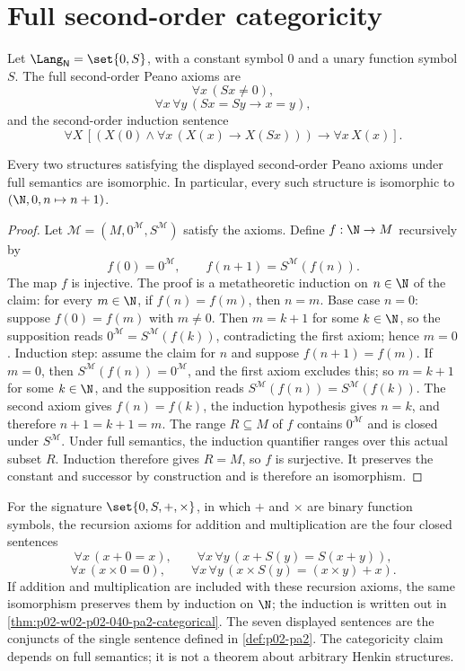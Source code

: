 \section{Full second-order categoricity}
\label{sec:second-order-logic-03}

Let \(\Lang_{\mathsf N}=\set{0,S}\), with a constant symbol \(0\) and a unary
function symbol \(S\).  The full second-order Peano axioms are
\[
  \forall x\,(Sx\ne0),
\]
\[
  \forall x\,\forall y\,(Sx=Sy\to x=y),
\]
and the second-order induction sentence
\[
  \forall X\,
  \left[
    \left(X(0)\land
      \forall x\,(X(x)\to X(Sx))\right)
    \to
    \forall x\,X(x)
  \right].
\]

\begin{theorem}
Every two structures satisfying the displayed second-order Peano axioms under
full semantics are isomorphic.  In particular, every such structure is
isomorphic to \((\N,0,n\mapsto n+1)\).
\end{theorem}

\begin{proof}
Let \(\mathcal M=(M,0^{\mathcal M},S^{\mathcal M})\) satisfy the axioms.  Define
\(f:\N\to M\) recursively by
\[
  f(0)=0^{\mathcal M},
  \qquad
  f(n+1)=S^{\mathcal M}(f(n)).
\]
The map \(f\) is injective.  The proof is a metatheoretic induction on
\(n\in\N\) of the claim: for every \(m\in\N\), if \(f(n)=f(m)\), then
\(n=m\).  Base case \(n=0\): suppose \(f(0)=f(m)\) with \(m\ne0\).  Then
\(m=k+1\) for some \(k\in\N\), so the supposition reads
\(0^{\mathcal M}=S^{\mathcal M}(f(k))\), contradicting the first axiom;
hence \(m=0\).  Induction step: assume the claim for \(n\) and suppose
\(f(n+1)=f(m)\).  If \(m=0\), then
\(S^{\mathcal M}(f(n))=0^{\mathcal M}\), and the first axiom excludes this;
so \(m=k+1\) for some \(k\in\N\), and the supposition reads
\(S^{\mathcal M}(f(n))=S^{\mathcal M}(f(k))\).  The second axiom gives
\(f(n)=f(k)\), the induction hypothesis gives \(n=k\), and therefore
\(n+1=k+1=m\).  The range \(R\subseteq M\) of \(f\) contains
\(0^{\mathcal M}\) and is closed under \(S^{\mathcal M}\).  Under full
semantics, the induction quantifier ranges over this actual subset \(R\).
Induction therefore gives \(R=M\), so \(f\) is surjective.  It preserves the
constant and successor by construction and is therefore an isomorphism.
\end{proof}

For the signature \(\set{0,S,+,\times}\), in which \(+\) and \(\times\) are
binary function symbols, the recursion axioms for addition and multiplication
are the four closed sentences
\[
  \forall x\,(x+0=x),
  \qquad
  \forall x\,\forall y\,(x+S(y)=S(x+y)),
\]
\[
  \forall x\,(x\times0=0),
  \qquad
  \forall x\,\forall y\,(x\times S(y)=(x\times y)+x).
\]
If addition and multiplication are included with these recursion axioms, the
same isomorphism preserves them by induction on \(\N\); the induction is
written out in \cref{thm:p02-w02-p02-040-pa2-categorical}.  The seven
displayed sentences are the conjuncts of the single sentence defined in
\cref{def:p02-pa2}.  The categoricity claim depends on full semantics; it is
not a theorem about arbitrary Henkin structures.

